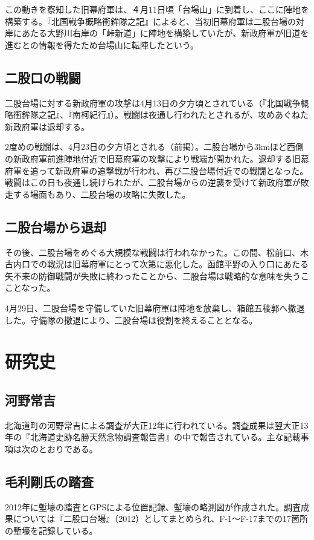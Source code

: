 \documentclass[14Q]{jsarticle}
\begin{document}
この動きを察知した旧幕府軍は、４月11日頃「台場山」に到着し、ここに陣地を構築する。『北国戦争概略衝鉾隊之記』によると、当初旧幕府軍は二股台場の対岸にあたる大野川右岸の「峠新道」に陣地を構築していたが、新政府軍が旧道を進むとの情報を得たため台場山に転陣したという。

\subsection{二股口の戦闘}
二股台場に対する新政府軍の攻撃は4月13日の夕方頃とされている（『北国戦争概略衝鉾隊之記』、『南柯紀行』）。戦闘は夜通し行われたとされるが、攻めあぐねた新政府軍は退却する。

2度めの戦闘は、4月23日の夕方頃とされる（前掲）。二股台場から3kmほど西側の新政府軍前進陣地付近で旧幕府軍の攻撃により戦端が開かれた。退却する旧幕府軍を追って新政府軍の追撃戦が行われ、再び二股台場付近での戦闘となった。戦闘はこの日も夜通し続けられたが、二股台場からの逆襲を受けて新政府軍が敗走する場面もあり、二股台場の攻略に失敗した。

\subsection{二股台場から退却}
その後、二股台場をめぐる大規模な戦闘は行われなかった。この間、松前口、木古内口での戦況は旧幕府軍にとって次第に悪化した。函館平野の入り口にあたる矢不来の防御戦闘が失敗に終わったことから、二股台場は戦略的な意味を失うこことなった。

4月29日、二股台場を守備していた旧幕府軍は陣地を放棄し、箱館五稜郭へ撤退した。守備隊の撤退により、二股台場は役割を終えることとなる。

\section{研究史}
\subsection{河野常吉}
北海道町の河野常吉による調査が大正12年に行われている。調査成果は翌大正13年の『北海道史跡名勝天然念物調査報告書』の中で報告されている。主な記載事項は次のとおりである。

\subsection{毛利剛氏の踏査}
2012年に塹壕の踏査とGPSによる位置記録、塹壕の略測図が作成された。調査成果については『二股口台場』（2012）としてまとめられ、F-1〜F-17までの17箇所の塹壕を記録している。
\end{document}
